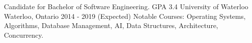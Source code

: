 


\begin{cventries}


\cventry
{Candidate for Bachelor of Software Engineering. GPA 3.4} %
{University of Waterloo}
{Waterloo, Ontario} %
    {2014 - 2019 (Expected)} %
{ %
    Notable Courses: Operating Systems, Algorithms, Database Management, AI, Data Structures, Architecture, Concurrency.
}


\end{cventries}
